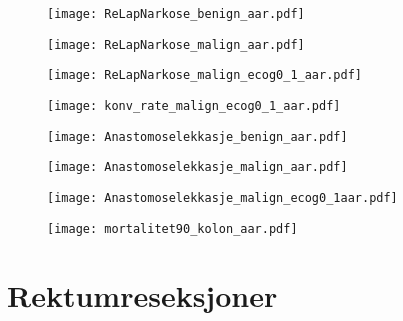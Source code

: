 \documentclass[norsk,a4paper]{article}\usepackage[]{graphicx}\usepackage[]{color}
\begin{document}
\begin{figure}[ht]
\centering
\texttt{[image: ReLapNarkose\_benign\_aar.pdf]}
\caption{}
\end{figure}

\begin{figure}[ht]
\centering
\texttt{[image: ReLapNarkose\_malign\_aar.pdf]}
\caption{}
\end{figure}

\begin{figure}[ht]
\centering
\texttt{[image: ReLapNarkose\_malign\_ecog0\_1\_aar.pdf]}
\caption{}
\end{figure}

\begin{figure}[ht]
\centering
\texttt{[image: konv\_rate\_malign\_ecog0\_1\_aar.pdf]}
\caption{}
\end{figure}

\begin{figure}[ht]
\centering
\texttt{[image: Anastomoselekkasje\_benign\_aar.pdf]}
\caption{}
\end{figure}

\begin{figure}[ht]
\centering
\texttt{[image: Anastomoselekkasje\_malign\_aar.pdf]}
\caption{}
\end{figure}

\begin{figure}[ht]
\centering
\texttt{[image: Anastomoselekkasje\_malign\_ecog0\_1aar.pdf]}
\caption{}
\end{figure}

\begin{figure}[ht]
\centering
\texttt{[image: mortalitet90\_kolon\_aar.pdf]}
\caption{}
\end{figure}

\clearpage

\section{Rektumreseksjoner}
\end{document}
